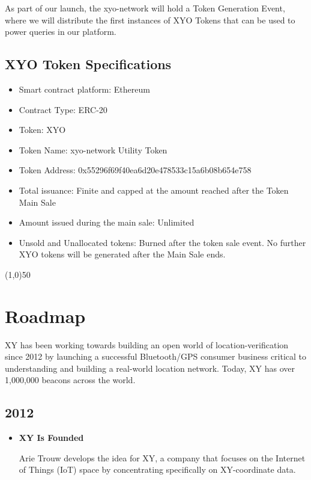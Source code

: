 \documentclass{article}
\begin{document}
As part of our launch, the \Gls{xyo-network} will hold a Token Generation Event, where we will distribute the first instances of XYO Tokens that can be used to power queries in our platform.

\subsection {XYO Token Specifications}
\begin{itemize}
\item Smart contract platform: Ethereum
\item Contract Type: ERC-20
\item Token: XYO
\item Token Name: \Gls{xyo-network} Utility Token
\item Token Address: 0x55296f69f40ea6d20e478533c15a6b08b654e758
\item Total issuance: Finite and capped at the amount reached after the Token Main Sale
\item Amount issued during the main sale: Unlimited
\item Unsold and Unallocated tokens: Burned after the token sale event. No further XYO tokens will be generated after the Main Sale ends.
\end{itemize}

\begin{center}
\line(1,0){50}
\end{center}

\section{Roadmap}
XY has been working towards building an open world of location-verification since 2012 by launching a successful Bluetooth/GPS consumer business critical to understanding and building a real-world location network. Today, XY has over 1,000,000 beacons across the world.

\subsection{2012}
\begin{itemize}
\item \textbf{XY Is Founded}

Arie Trouw develops the idea for XY, a company that focuses on the Internet of Things (IoT) space by concentrating specifically on XY-coordinate data.
\end{itemize}
\end{document}
